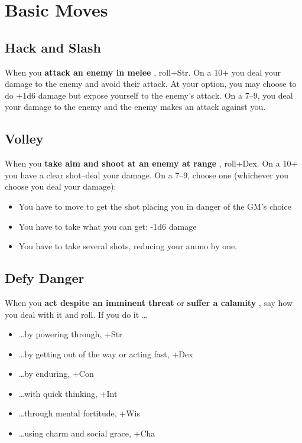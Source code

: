 \section*{Basic Moves}
\subsection{Hack and Slash}


 When you \textbf{attack an enemy in melee}
, roll+Str. On a 10+ you deal your damage to the enemy and avoid their attack. At your option, you may choose to do +1d6 damage but expose yourself to the enemy's attack. On a 7--9, you deal your damage to the enemy and the enemy makes an attack against you.
\subsection{Volley}


 When you \textbf{take aim and shoot at an enemy at range}
, roll+Dex. On a 10+ you have a clear shot--deal your damage. On a 7--9, choose one (whichever you choose you deal your damage):
\begin{itemize}
\item You have to move to get the shot placing you in danger of the GM's choice
\item You have to take what you can get: -1d6 damage
\item You have to take several shots, reducing your ammo by one.

\end{itemize}
\subsection{Defy Danger}


 When you \textbf{act despite an imminent threat}
 or \textbf{suffer a calamity}
, say how you deal with it and roll. If you do it \ldots 
\begin{itemize}
\item  \ldots by powering through, +Str
\item  \ldots by getting out of the way or acting fast, +Dex
\item  \ldots by enduring, +Con
\item  \ldots with quick thinking, +Int
\item  \ldots through mental fortitude, +Wis
\item  \ldots using charm and social grace, +Cha

\end{itemize}


